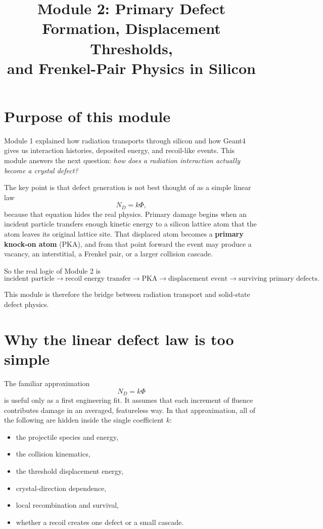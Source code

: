 \documentclass[11pt]{article}
\begin{document}
\title{Module 2: Primary Defect Formation, Displacement Thresholds,\\ and Frenkel-Pair Physics in Silicon}
\author{}
\date{}
\maketitle

\section{Purpose of this module}

Module 1 explained how radiation transports through silicon and how Geant4 gives us interaction histories, deposited energy, and recoil-like events. This module answers the next question: \emph{how does a radiation interaction actually become a crystal defect?}

The key point is that defect generation is not best thought of as a simple linear law
\begin{equation}
N_D = k\Phi,
\end{equation}
because that equation hides the real physics. Primary damage begins when an incident particle transfers enough kinetic energy to a silicon lattice atom that the atom leaves its original lattice site. That displaced atom becomes a \textbf{primary knock-on atom} (PKA), and from that point forward the event may produce a vacancy, an interstitial, a Frenkel pair, or a larger collision cascade.

So the real logic of Module 2 is
\begin{equation}
\text{incident particle} \rightarrow \text{recoil energy transfer} \rightarrow \text{PKA} \rightarrow \text{displacement event} \rightarrow \text{surviving primary defects}.
\end{equation}

This module is therefore the bridge between radiation transport and solid-state defect physics.

\section{Why the linear defect law is too simple}

The familiar approximation
\begin{equation}
N_D = k\Phi
\end{equation}
is useful only as a first engineering fit. It assumes that each increment of fluence contributes damage in an averaged, featureless way. In that approximation, all of the following are hidden inside the single coefficient $k$:
\begin{itemize}
    \item the projectile species and energy,
    \item the collision kinematics,
    \item the threshold displacement energy,
    \item crystal-direction dependence,
    \item local recombination and survival,
    \item whether a recoil creates one defect or a small cascade.
\end{itemize}
\end{document}

